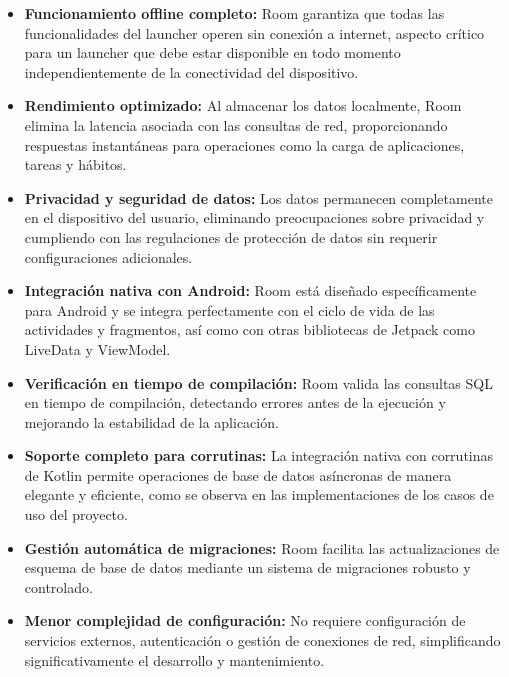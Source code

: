 \begin{itemize}
    \item \textbf{Funcionamiento offline completo:} Room garantiza que todas las funcionalidades del launcher operen sin conexión a internet, aspecto crítico para un launcher que debe estar disponible en todo momento independientemente de la conectividad del dispositivo.
    
    \item \textbf{Rendimiento optimizado:} Al almacenar los datos localmente, Room elimina la latencia asociada con las consultas de red, proporcionando respuestas instantáneas para operaciones como la carga de aplicaciones, tareas y hábitos.
    
    \item \textbf{Privacidad y seguridad de datos:} Los datos permanecen completamente en el dispositivo del usuario, eliminando preocupaciones sobre privacidad y cumpliendo con las regulaciones de protección de datos sin requerir configuraciones adicionales.
    
    \item \textbf{Integración nativa con Android:} Room está diseñado específicamente para Android y se integra perfectamente con el ciclo de vida de las actividades y fragmentos, así como con otras bibliotecas de Jetpack como LiveData y ViewModel.
    
    \item \textbf{Verificación en tiempo de compilación:} Room valida las consultas SQL en tiempo de compilación, detectando errores antes de la ejecución y mejorando la estabilidad de la aplicación.
    
    \item \textbf{Soporte completo para corrutinas:} La integración nativa con corrutinas de Kotlin permite operaciones de base de datos asíncronas de manera elegante y eficiente, como se observa en las implementaciones de los casos de uso del proyecto.
    
    \item \textbf{Gestión automática de migraciones:} Room facilita las actualizaciones de esquema de base de datos mediante un sistema de migraciones robusto y controlado.
    
    \item \textbf{Menor complejidad de configuración:} No requiere configuración de servicios externos, autenticación o gestión de conexiones de red, simplificando significativamente el desarrollo y mantenimiento.
\end{itemize}

